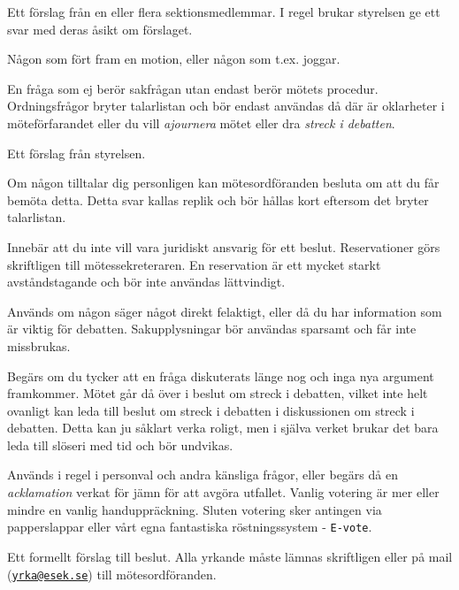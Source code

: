 \documentclass[../_main/handlingar.tex]{subfiles}
\begin{document}
\begin{description}[style=multiline, leftmargin=45mm]
    \item[Motion]
    Ett förslag från en eller flera sektionsmedlemmar. I regel brukar styrelsen ge ett svar med deras åsikt om förslaget.
    \item[Motionär] Någon som fört fram en motion, eller någon som t.ex. joggar.
    \item[Ordningsfråga]
    En fråga som ej berör sakfrågan utan endast berör mötets procedur. Ordningsfrågor bryter talarlistan och bör endast användas då där är oklarheter i möteförfarandet eller du vill \emph{ajournera} mötet eller dra \emph{streck i debatten}.
    \item[Proposition]
    Ett förslag från styrelsen.
    \item[Replik]
    Om någon tilltalar dig personligen kan mötesordföranden besluta om att du får bemöta detta. Detta svar kallas replik och bör hållas kort eftersom det bryter talarlistan.
    \item[Reservation]
    Innebär att du inte vill vara juridiskt ansvarig för ett beslut. Reservationer görs skriftligen till mötessekreteraren. En reservation är ett mycket starkt avståndstagande och bör inte användas lättvindigt.
    \item[Sakupplysning]
    Används om någon säger något direkt felaktigt, eller då du har information som är viktig för debatten. Sakupplysningar bör användas sparsamt och får inte missbrukas.
    \item[Streck i debatten]
    Begärs om du tycker att en fråga diskuterats länge nog och inga nya argument framkommer. Mötet går då över i beslut om streck i debatten, vilket inte helt ovanligt kan leda till beslut om streck i debatten i diskussionen om streck i debatten. Detta kan ju såklart verka roligt, men i själva verket brukar det bara leda till slöseri med tid och bör undvikas.
    \item[Votering]
    Används i regel i personval och andra känsliga frågor, eller begärs då en \emph{acklamation} verkat för jämn för att avgöra utfallet. Vanlig votering är mer eller mindre en vanlig handuppräckning. Sluten votering sker antingen via papperslappar eller vårt egna fantastiska röstningssystem - \texttt{E-vote}.
    \item[Yrkande]
    Ett formellt förslag till beslut. Alla yrkande måste lämnas skriftligen eller på mail (\href{mailto:yrka@esek.se}{\texttt{yrka@esek.se}}) till mötesordföranden.
\end{description}
\end{document}
